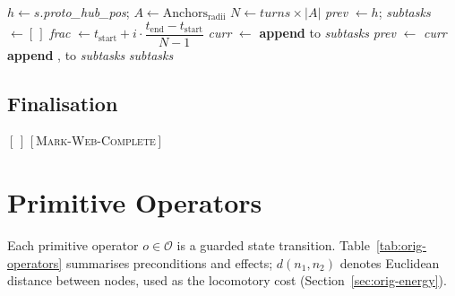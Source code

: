 \begin{algorithm}[H]
\caption{Method for \textsc{Build-Auxiliary-Spiral} / \textsc{Build-Capture-Spiral} --- Archimedean spiral traversal}
\label{alg:orig-spiral}
\begin{algorithmic}[1]
 
  \State $h \gets s.$\textit{proto\_hub\_pos}; \quad $A \gets \mathrm{Anchors}_{\mathrm{radii}}$
  \State $N \gets \textit{turns} \times |A|$
  \State \textit{prev} $\gets h$; \quad \textit{subtasks} $\gets [\,]$
    \State \textit{frac} $\gets t_{\mathrm{start}} + i \cdot \dfrac{t_{\mathrm{end}} - t_{\mathrm{start}}}{N - 1}$
    \State \textit{curr} $\gets$ 
    \State \textbf{append}  to \textit{subtasks}
    \State \textit{prev} $\gets$ \textit{curr}
  \EndFor
  \State \textbf{append} ,  to \textit{subtasks}
  \State \Return \textit{subtasks}
\EndFunction
\end{algorithmic}
\end{algorithm}

\subsection{Finalisation}
\label{sec:orig-finalisation}

\begin{algorithm}[H]
\caption{Method for \textsc{Finalise-Web}}
\label{alg:orig-finalise}
\begin{algorithmic}[1]
    \State \Return $[\,]$
  \EndIf
  \State \Return $[\,$\textsc{Mark-Web-Complete}$\,]$
\EndFunction
\end{algorithmic}
\end{algorithm}

\section{Primitive Operators}
\label{sec:orig-operators}

Each primitive operator $o \in \mathcal{O}$ is a guarded state transition. Table~\ref{tab:orig-operators} summarises preconditions and effects; $d(n_1, n_2)$ denotes Euclidean distance between nodes, used as the locomotory cost (Section~\ref{sec:orig-energy}).

